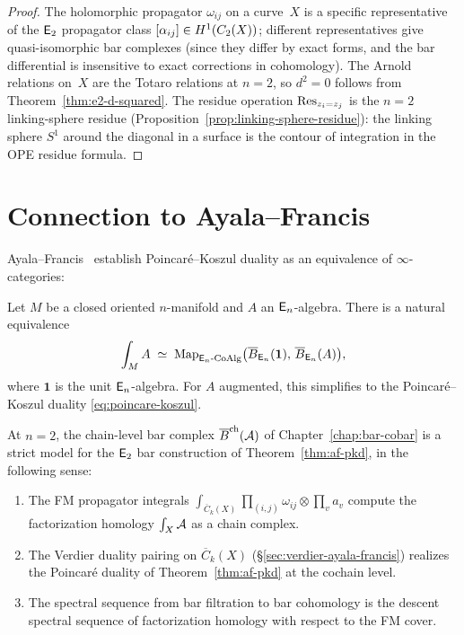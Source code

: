 \begin{proof}
The holomorphic propagator $\omega_{ij}$ on a curve~$X$ is a specific
representative of the $\mathsf{E}_2$ propagator class
$[\alpha_{ij}] \in H^1(C_2(X))$; different representatives give
quasi-isomorphic bar complexes (since they differ by exact forms,
and the bar differential is insensitive to exact corrections in
cohomology).  The Arnold relations on~$X$ are the Totaro relations at
$n = 2$, so $d^2 = 0$ follows from
Theorem~\ref{thm:e2-d-squared}.  The residue operation
$\operatorname{Res}_{z_i = z_j}$ is the $n = 2$ linking-sphere residue
(Proposition~\ref{prop:linking-sphere-residue}): the linking sphere
$S^1$ around the diagonal in a surface is the contour of integration
in the OPE residue formula.
\end{proof}



\section{Connection to Ayala--Francis}
\label{sec:ayala-francis-connection}

Ayala--Francis~\cite{AF15} establish Poincar\'e--Koszul duality as
an equivalence of $\infty$-categories:

\begin{theorem}
\label{thm:af-pkd}
Let $M$ be a closed oriented $n$-manifold and $A$ an $\mathsf{E}_n$-algebra.
There is a natural equivalence
\[
\int_M A
\;\simeq\;
\mathrm{Map}_{\mathsf{E}_n\text{-}\mathrm{CoAlg}}
\bigl(\overline{B}_{\mathsf{E}_n}(\mathbf{1}),\, \overline{B}_{\mathsf{E}_n}(A)\bigr),
\]
where $\mathbf{1}$ is the unit $\mathsf{E}_n$-algebra.
For $A$ augmented, this simplifies to the Poincar\'e--Koszul duality
\eqref{eq:poincare-koszul}.
\end{theorem}

\begin{proposition}[Our construction refines AF at \texorpdfstring{$n = 2$}{n = 2};
\ClaimStatusProvedHere]
\label{prop:refines-af}
At $n = 2$, the chain-level bar complex
$\overline{B}^{\mathrm{ch}}(\mathcal{A})$ of
Chapter~\textup{\ref{chap:bar-cobar}} is a
strict model for the $\mathsf{E}_2$ bar construction of
Theorem~\textup{\ref{thm:af-pkd}}, in the following sense:
\begin{enumerate}[label=\textup{(\alph*)}]
\item The FM propagator integrals
  $\int_{\overline{C}_k(X)} \prod_{(i,j)} \omega_{ij}
  \otimes \prod_v a_v$
  compute the factorization homology $\int_X \mathcal{A}$ as a chain
  complex.
\item The Verdier duality pairing on $\overline{C}_k(X)$
  \textup{(}\S\textup{\ref{sec:verdier-ayala-francis})} realizes the
  Poincar\'e duality of Theorem~\textup{\ref{thm:af-pkd}} at the
  cochain level.
\item The spectral sequence from bar filtration to bar cohomology
  is the descent spectral sequence of factorization homology with
  respect to the FM cover.
\end{enumerate}
\end{proposition}

